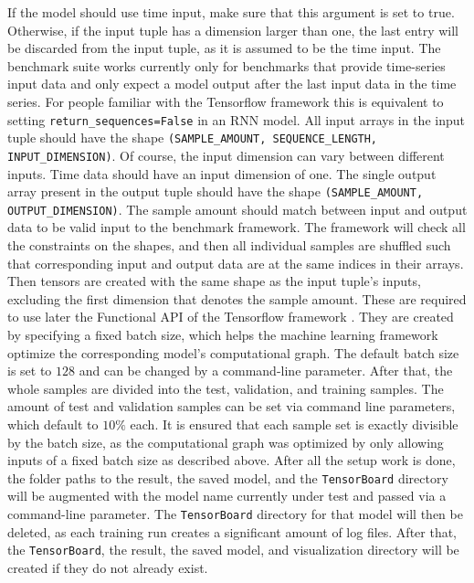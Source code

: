 \documentclass[draft,final]{vutinfth} %
\begin{document}
    If the model should use time input, make sure that this argument is set to true.
    Otherwise, if the input tuple has a dimension larger than one, the last entry will be discarded from the input tuple, as it is assumed to be the time input.
    The benchmark suite works currently only for benchmarks that provide time-series input data and only expect a model output after the last input data in the time series.
    For people familiar with the Tensorflow framework \cite{Tensorflow} this is equivalent to setting \texttt{return\_sequences=False} in an RNN model.
    All input arrays in the input tuple should have the shape \texttt{(SAMPLE\_AMOUNT, SEQUENCE\_LENGTH, INPUT\_DIMENSION)}.
    Of course, the input dimension can vary between different inputs. Time data should have an input dimension of one.
    The single output array present in the output tuple should have the shape \texttt{(SAMPLE\_AMOUNT, OUTPUT\_DIMENSION)}.
    The sample amount should match between input and output data to be valid input to the benchmark framework.
    The framework will check all the constraints on the shapes, and then all individual samples are shuffled such that corresponding input and output data are at the same indices in their arrays.
    Then tensors are created with the same shape as the input tuple's inputs, excluding the first dimension that denotes the sample amount.
    These are required to use later the Functional API of the Tensorflow framework \cite{Tensorflow}.
    They are created by specifying a fixed batch size, which helps the machine learning framework optimize the corresponding model's computational graph.
    The default batch size is set to $128$ and can be changed by a command-line parameter.
    After that, the whole samples are divided into the test, validation, and training samples. The amount of test and validation samples can be set via command line parameters, which default to $10\%$ each.
    It is ensured that each sample set is exactly divisible by the batch size, as the computational graph was optimized by only allowing inputs of a fixed batch size as described above.
    After all the setup work is done, the folder paths to the result, the saved model, and the \texttt{TensorBoard} directory will be augmented with the model name currently under test and passed via a command-line parameter.
    The \texttt{TensorBoard} directory for that model will then be deleted, as each training run creates a significant amount of log files.
    After that, the \texttt{TensorBoard}, the result, the saved model, and visualization directory will be created if they do not already exist.
\end{document}
